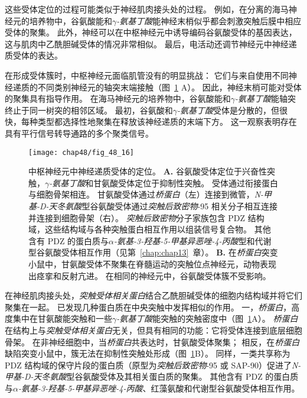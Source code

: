 这些受体定位的过程可能类似于神经肌肉接头处的过程。
例如，在分离的海马神经元的培养物中，谷氨酸能和\textit{$ \gamma $-氨基丁酸}能神经末梢似乎都会刺激突触后膜中相应受体的聚集。
此外，神经可以在中枢神经元中诱导编码谷氨酸受体的基因表达，这与肌肉中乙酰胆碱受体的情况非常相似。
最后，电活动还调节神经元中神经递质受体的表达。


在形成受体簇时，中枢神经元面临肌管没有的明显挑战：
它们与来自使用不同神经递质的不同类别神经元的轴突末端接触（图~\ref{fig:48_16} A）。
因此，神经末梢可能对受体的聚集具有指导作用。
在海马神经元的培养物中，谷氨酸能和\textit{$ \gamma $-氨基丁酸}能轴突终止于同一树突的相邻区域。
最初，谷氨酸和\textit{$ \gamma $-氨基丁酸}受体是分散的，但很快，每种类型都选择性地聚集在释放该神经递质的末端下方。
这一观察表明存在具有平行信号转导通路的多个聚类信号。


\begin{figure}[htbp]
	\centering
	\texttt{[image: chap48/fig\_48\_16]}
	\caption{中枢神经元中神经递质受体的定位。
		\textbf{A.} 谷氨酸受体定位于兴奋性突触，\textit{$ \gamma $-氨基丁酸}和甘氨酸受体定位于抑制性突触。
		受体通过衔接蛋白与细胞骨架相连。
		甘氨酸受体通过\textit{桥蛋白}（左）连接到微管，\textit{N-甲基-D-天冬氨酸}型谷氨酸受体通过\textit{突触后致密物}-95 相关分子相互连接并连接到细胞骨架（右）。
		\textit{突触后致密物}分子家族包含 PDZ 结构域，这些结构域与各种突触蛋白相互作用以组装信号复合物。
		其他含有 PDZ 的蛋白质与\textit{$\alpha$-氨基-3-羟基-5-甲基异恶唑-4-丙酸}型和代谢型谷氨酸受体相互作用（见第~\ref{chap:chap13}~章）。
		\textbf{B.} 在\textit{桥蛋白}突变小鼠中，甘氨酸受体不聚集在脊髓运动的突触位点神经元，动物表现出痉挛和反射亢进。
		在相同的神经元中，谷氨酸受体簇不受影响\cite{feng1998dual}。}
	\label{fig:48_16}
\end{figure}


在神经肌肉接头处，\textit{突触受体相关蛋白}结合乙酰胆碱受体的细胞内结构域并将它们聚集在一起。
已发现几种蛋白质在中央突触中发挥相似的作用。
一，\textit{桥蛋白}，高度集中在甘氨酸能突触和一些\textit{$ \gamma $-氨基丁酸}能突触的突触密度中（图~\ref{fig:48_16}A）。
\textit{桥蛋白}在结构上与\textit{突触受体相关蛋白}无关，但具有相同的功能：它将受体连接到底层细胞骨架。
在非神经细胞中，当\textit{桥蛋白}共表达时，甘氨酸受体聚集；
相反，在\textit{桥蛋白}缺陷突变小鼠中，簇无法在抑制性突触处形成（图~\ref{fig:48_16}B）。
同样，一类共享称为 PDZ 结构域的保守片段的蛋白质（原型为\textit{突触后致密物}-95 或 SAP-90）促进了\textit{N-甲基-D-天冬氨酸}型谷氨酸受体及其相关蛋白质的聚集。
其他含有 PDZ 的蛋白质与\textit{$\alpha$-氨基-3-羟基-5-甲基异恶唑-4-丙酸}、红藻氨酸和代谢型谷氨酸受体相互作用。



